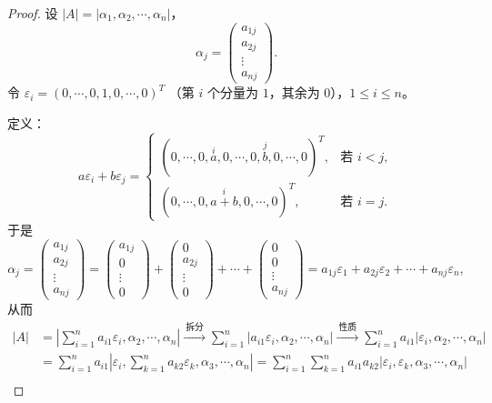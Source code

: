 \begin{proof}
设 $|A|=|\alpha_1,\alpha_2,\cdots,\alpha_n|$，
\[
\alpha_j=\begin{pmatrix}a_{1j}\\a_{2j}\\\vdots\\a_{nj}\end{pmatrix}.
\]
令 $\varepsilon_i=(0,\cdots,0,1,0,\cdots,0)^{T}$
（第 $i$ 个分量为 $1$，其余为 $0$），$1\le i\le n$。

定义：
\[
a\varepsilon_i+b\varepsilon_j=
\begin{cases}
(0,\cdots,0,\overset{i}{a},0,\cdots,0,\overset{j}{b},0,\cdots,0)^{T},
  & \text{若 } i<j,\\[8pt]
(0,\cdots,0,\overset{i}{a+b},0,\cdots,0)^{T},
  & \text{若 } i=j.
\end{cases}
\]
于是
\[
\alpha_j=\begin{pmatrix}a_{1j}\\a_{2j}\\\vdots\\a_{nj}\end{pmatrix}
=\begin{pmatrix}a_{1j}\\0\\\vdots\\0\end{pmatrix}
+\begin{pmatrix}0\\a_{2j}\\\vdots\\0\end{pmatrix}
+\cdots+
\begin{pmatrix}0\\0\\\vdots\\a_{nj}\end{pmatrix}
=a_{1j}\varepsilon_1+a_{2j}\varepsilon_2+\cdots+a_{nj}\varepsilon_n,
\]
从而
\begin{align*}
|A|&=\left|\sum_{i=1}^n a_{i1}\varepsilon_i,\alpha_2,\cdots,\alpha_n\right|
\xrightarrow{\ \text{拆分}\ }
\sum_{i=1}^n\left|a_{i1}\varepsilon_i,\alpha_2,\cdots,\alpha_n\right|
\xrightarrow{\ \text{性质}\ }
\sum_{i=1}^n a_{i1}\left|\varepsilon_i,\alpha_2,\cdots,\alpha_n\right|\\
&=\sum_{i=1}^n a_{i1}\left|\varepsilon_i,\sum_{k=1}^n a_{k2}\varepsilon_k,\alpha_3,\cdots,\alpha_n\right|
=\sum_{i=1}^n\sum_{k=1}^n a_{i1}a_{k2}
\left|\varepsilon_i,\varepsilon_k,\alpha_3,\cdots,\alpha_n\right|\\

\end{align*}
\end{proof}
